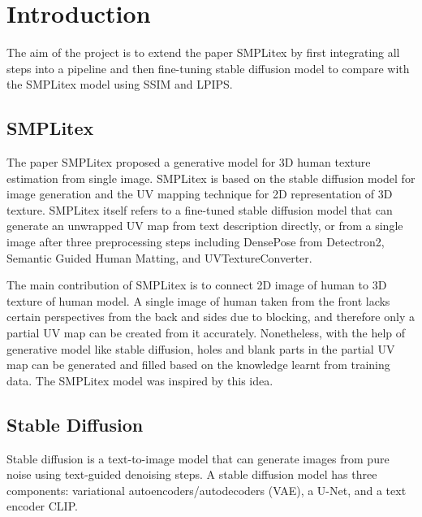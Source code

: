 \documentclass[acmtog]{acmart}
\begin{document}


\maketitle

\section{Introduction}
The aim of the project is to extend the paper SMPLitex \cite{casas2023smplitex} by first integrating all steps into a pipeline and then fine-tuning stable diffusion model to compare with the SMPLitex model using SSIM and LPIPS.

\subsection{SMPLitex}

The paper SMPLitex \cite{casas2023smplitex} proposed a generative model for 3D human texture estimation from single image. SMPLitex is based on the stable diffusion model for image generation and the UV mapping technique for 2D representation of 3D texture. SMPLitex itself refers to a fine-tuned stable diffusion model that can generate an unwrapped UV map from text description directly, or from a single image after three preprocessing steps including DensePose from Detectron2, Semantic Guided Human Matting, and UVTextureConverter.

The main contribution of SMPLitex is to connect 2D image of human to 3D texture of human model. A single image of human taken from the front lacks certain perspectives from the back and sides due to blocking, and therefore only a partial UV map can be created from it accurately. Nonetheless, with the help of generative model like stable diffusion, holes and blank parts in the partial UV map can be generated and filled based on the knowledge learnt from training data. The SMPLitex model was inspired by this idea.

\subsection{Stable Diffusion}
Stable diffusion is a text-to-image model that can generate images from pure noise using text-guided denoising steps. A stable diffusion model has three components: variational autoencoders/autodecoders (VAE),  a U-Net, and a text encoder CLIP.
\end{document}
